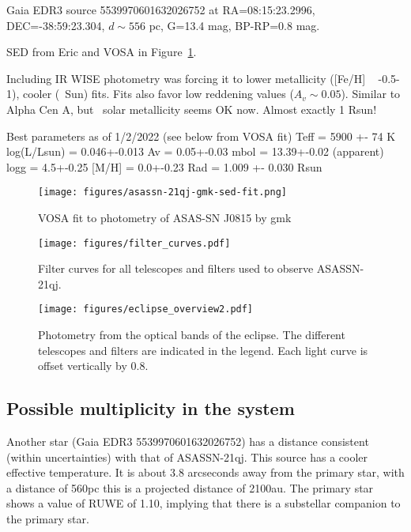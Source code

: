 \documentclass{aa}
\begin{document}
Gaia EDR3 source 5539970601632026752 at RA=08:15:23.2996, DEC=-38:59:23.304, $d\sim 556$ pc, G=13.4 mag, BP-RP=0.8 mag.

SED from Eric and VOSA in Figure~\ref{fig:sed}.

 Including IR WISE photometry
was forcing it to lower metallicity ([Fe/H] ~ -0.5-1), cooler (~Sun) fits. Fits also favor low reddening values ($A_v\sim 0.05$). 
Similar to Alpha Cen A, but ~solar metallicity seems OK now. Almost exactly 1 Rsun! 

Best parameters as of 1/2/2022 (see below from VOSA fit) 
Teff = 5900 +- 74 K
log(L/Lsun) = 0.046+-0.013 
Av = 0.05+-0.03
mbol = 13.39+-0.02 (apparent)
logg = 4.5+-0.25
[M/H] = 0.0+-0.23 
Rad = 1.009 +- 0.030 Rsun


\begin{figure}
   \centering
   \texttt{[image: figures/asassn-21qj-gmk-sed-fit.png]}
      \caption{VOSA fit to photometry of ASAS-SN J0815 by gmk}
         \label{fig:sed}
\end{figure}


\begin{figure}
   \begin{centering}
   \texttt{[image: figures/filter\_curves.pdf]}
      \caption{Filter curves for all telescopes and filters used to observe ASASSN-21qj.}
      \label{fig:allfilters}
      \end{centering}
\end{figure}


\begin{figure*}
   \begin{centering}
   \texttt{[image: figures/eclipse\_overview2.pdf]}
      \caption{Photometry from the optical bands of the eclipse.
The different telescopes and filters are indicated in the legend.
%
Each light curve is offset vertically by 0.8.
              }
        \label{fig:eclipse_overview}
    \end{centering}
\end{figure*}



\subsection{Possible multiplicity in the  system}

Another star (Gaia EDR3 5539970601632026752) has a distance consistent (within uncertainties) with that of ASASSN-21qj.
%
This source has a cooler effective temperature.
%
It is about 3.8 arcseconds away from the primary star, with a distance of 560pc this is a projected distance of 2100au.
%
The primary star shows a value of RUWE of 1.10, implying that there is a substellar companion to the primary star.
\end{document}
